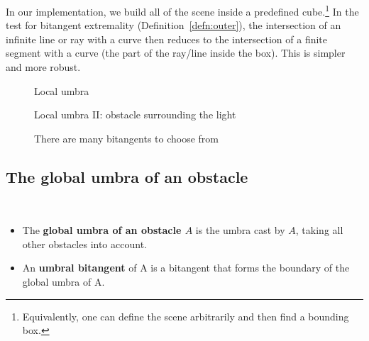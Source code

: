 \documentclass[12pt]{article}
\begin{document}
\begin{implementation}
In our implementation, we build all of the scene inside
a predefined cube.\footnote{Equivalently, one can define the scene
	arbitrarily and then find a bounding box.}
In the test for bitangent extremality (Definition~\ref{defn:outer}),
the intersection of an infinite line or ray
with a curve then reduces to the intersection of a finite segment with a curve
(the part of the ray/line inside the box).
This is simpler and more robust.
\end{implementation}


\begin{figure}[hb]
\centerline{}
\caption{Local umbra}
\label{fig:G2}
\end{figure}

\begin{figure}[hb]
\centerline{}
\caption{Local umbra II: obstacle surrounding the light}
\label{fig:G3}
\end{figure}

\begin{figure}[hb]
\centerline{}
\caption{There are many bitangents to choose from}
\label{fig:G2a}
\end{figure}


\subsection{The global umbra of an obstacle}

\begin{defn2}
\label{defn:global}
\ \ 
\begin{itemize}
\item
The {\bf global umbra of an obstacle $A$} is the umbra cast by $A$,
taking all other obstacles into account.
\item
An {\bf umbral bitangent} of A is a bitangent 
that forms the boundary of the global umbra of A.
\end{itemize}
\end{defn2}
\end{document}

